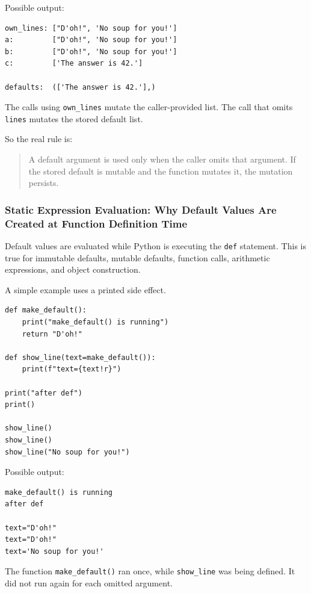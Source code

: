 Possible output:

\begin{verbatim}
own_lines: ["D'oh!", 'No soup for you!']
a:         ["D'oh!", 'No soup for you!']
b:         ["D'oh!", 'No soup for you!']
c:         ['The answer is 42.']

defaults:  (['The answer is 42.'],)
\end{verbatim}

The calls using \texttt{own\_lines} mutate the caller-provided list. The call that omits \texttt{lines} mutates the stored default list.

So the real rule is:

\begin{quote}
A default argument is used only when the caller omits that argument. If the stored default is mutable and the function mutates it, the mutation persists.
\end{quote}

\subsubsection{Static Expression Evaluation: Why Default Values Are Created at Function Definition Time}

Default values are evaluated while Python is executing the \texttt{def} statement. This is true for immutable defaults, mutable defaults, function calls, arithmetic expressions, and object construction.

A simple example uses a printed side effect.

\begin{verbatim}
def make_default():
    print("make_default() is running")
    return "D'oh!"

def show_line(text=make_default()):
    print(f"text={text!r}")

print("after def")
print()

show_line()
show_line()
show_line("No soup for you!")
\end{verbatim}

Possible output:

\begin{verbatim}
make_default() is running
after def

text="D'oh!"
text="D'oh!"
text='No soup for you!'
\end{verbatim}

The function \texttt{make\_default()} ran once, while \texttt{show\_line} was being defined. It did not run again for each omitted argument.

